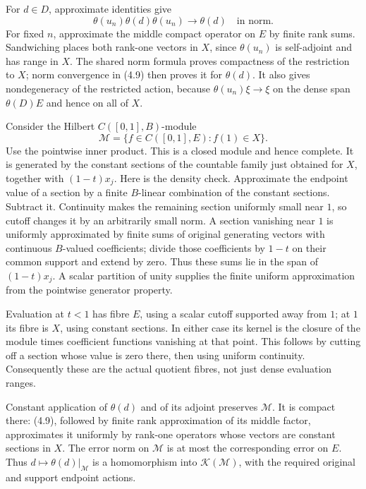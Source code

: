 \documentclass[
  11pt,
]{article}
\begin{document}
For \(d\in D\), approximate identities give \[
\theta(u_n)\theta(d)\theta(u_n)\longrightarrow\theta(d)
\quad\text{in norm}.
\tag{4.9}
\] For fixed \(n\), approximate the middle compact operator on \(E\) by
finite rank sums. Sandwiching places both rank-one vectors in \(X\),
since \(\theta(u_n)\) is self-adjoint and has range in \(X\). The shared
norm formula proves compactness of the restriction to \(X\); norm
convergence in (4.9) then proves it for \(\theta(d)\). It also gives
nondegeneracy of the restricted action, because \(\theta(u_n)\xi\to\xi\)
on the dense span \(\theta(D)E\) and hence on all of \(X\).

Consider the Hilbert \(C([0,1],B)\)-module \[
\mathcal M=\{f\in C([0,1],E):f(1)\in X\}.
\tag{4.10}
\] Use the pointwise inner product. This is a closed module and hence
complete. It is generated by the constant sections of the countable
family just obtained for \(X\), together with \((1-t)x_j\). Here is the
density check. Approximate the endpoint value of a section by a finite
\(B\)-linear combination of the constant sections. Subtract it.
Continuity makes the remaining section uniformly small near \(1\), so
cutoff changes it by an arbitrarily small norm. A section vanishing near
\(1\) is uniformly approximated by finite sums of original generating
vectors with continuous \(B\)-valued coefficients; divide those
coefficients by \(1-t\) on their common support and extend by zero. Thus
these sums lie in the span of \((1-t)x_j\). A scalar partition of unity
supplies the finite uniform approximation from the pointwise generator
property.

Evaluation at \(t<1\) has fibre \(E\), using a scalar cutoff supported
away from \(1\); at \(1\) its fibre is \(X\), using constant sections.
In either case its kernel is the closure of the module times coefficient
functions vanishing at that point. This follows by cutting off a section
whose value is zero there, then using uniform continuity. Consequently
these are the actual quotient fibres, not just dense evaluation ranges.

Constant application of \(\theta(d)\) and of its adjoint preserves
\(\mathcal M\). It is compact there: (4.9), followed by finite rank
approximation of its middle factor, approximates it uniformly by
rank-one operators whose vectors are constant sections in \(X\). The
error norm on \(\mathcal M\) is at most the corresponding error on
\(E\). Thus \(d\mapsto\theta(d)|_{\mathcal M}\) is a homomorphism into
\(\mathcal K(\mathcal M)\), with the required original and support
endpoint actions.
\end{document}
